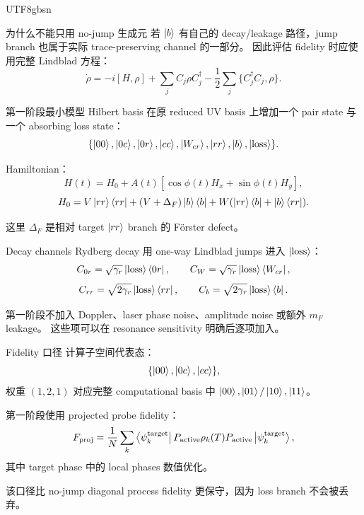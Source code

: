 \documentclass[aspectratio=169,11pt]{beamer}
\newcommand{\ketb}{\ket{b}}
\newcommand{\ketloss}{\ket{\mathrm{loss}}}
\newcommand{\Dforster}{\Delta_F}
\newcommand{\Fproj}{F_{\mathrm{proj}}}
\begin{document}
\begin{CJK*}{UTF8}{gbsn}
\begin{frame}{为什么不能只用 no-jump 生成元}
  若 \(\ketb\) 有自己的 decay/leakage 路径，jump branch 也属于实际 trace-preserving channel 的一部分。
  因此评估 fidelity 时应使用完整 Lindblad 方程：
  \[
    \dot\rho=-i[H,\rho]+\sum_j C_j\rho C_j^\dagger
    -\frac12\sum_j\{C_j^\dagger C_j,\rho\}.
  \]
\end{frame}

\begin{frame}{第一阶段最小模型}
  Hilbert basis 在原 reduced UV basis 上增加一个 pair state 与一个 absorbing loss state：
  \[
  \{\ket{00},\ket{0c},\ket{0r},\ket{cc},\ket{W_{cr}},\ket{rr},\ketb,\ketloss\}.
  \]

  Hamiltonian：
  \[
    H(t)=H_0 + A(t)\left[\cos\phi(t)H_x+\sin\phi(t)H_y\right],
  \]
  \[
    H_0 = V\ket{rr}\bra{rr}
    +(V+\Dforster)\ketb\bra{b}
    +W(\ket{rr}\bra{b}+\ketb\bra{rr}).
  \]

  这里 \(\Dforster\) 是相对 target \(\ket{rr}\) branch 的 Förster defect。
\end{frame}

\begin{frame}{Decay channels}
  Rydberg decay 用 one-way Lindblad jumps 进入 \(\ketloss\)：
  \[
    C_{0r}=\sqrt{\gamma_r}\ketloss\bra{0r},
    \qquad
    C_{W}=\sqrt{\gamma_r}\ketloss\bra{W_{cr}},
  \]
  \[
    C_{rr}=\sqrt{2\gamma_r}\ketloss\bra{rr},
    \qquad
    C_b=\sqrt{2\gamma_r}\ketloss\bra{b}.
  \]

  第一阶段不加入 Doppler、laser phase noise、amplitude noise 或额外 \(m_F\) leakage。
  这些项可以在 resonance sensitivity 明确后逐项加入。
\end{frame}

\begin{frame}{Fidelity 口径}
  计算子空间代表态：
  \[
    \{\ket{00},\ket{0c},\ket{cc}\},
  \]
  权重 \((1,2,1)\) 对应完整 computational basis 中
  \(\ket{00},\ket{01}/\ket{10},\ket{11}\)。

  第一阶段使用 projected probe fidelity：
  \[
    \Fproj = \frac{1}{N}\sum_k
    \bra{\psi_k^{\mathrm{target}}}
    P_{\mathrm{active}}\rho_k(T)P_{\mathrm{active}}
    \ket{\psi_k^{\mathrm{target}}},
  \]
  其中 target phase 中的 local phases 数值优化。

  该口径比 no-jump diagonal process fidelity 更保守，因为 loss branch 不会被丢弃。
\end{frame}


\end{CJK*}
\end{document}
